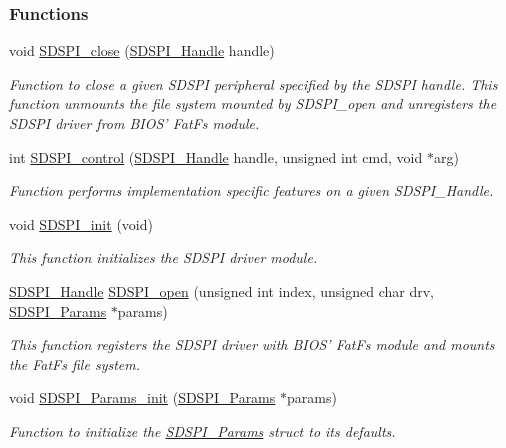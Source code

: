 \subsubsection*{Functions}
\begin{DoxyCompactItemize}
\item 
void \hyperlink{_s_d_s_p_i_8h_a8816c223935b575f10acd5277b9a8ca5}{S\-D\-S\-P\-I\-\_\-close} (\hyperlink{_s_d_s_p_i_8h_abd3d22133d60c2e5afd49722d6bafb7e}{S\-D\-S\-P\-I\-\_\-\-Handle} handle)
\begin{DoxyCompactList}\small\item\em Function to close a given S\-D\-S\-P\-I peripheral specified by the S\-D\-S\-P\-I handle. This function unmounts the file system mounted by S\-D\-S\-P\-I\-\_\-open and unregisters the S\-D\-S\-P\-I driver from B\-I\-O\-S' Fat\-Fs module. \end{DoxyCompactList}\item 
int \hyperlink{_s_d_s_p_i_8h_a541a1db109382fe090ed7a9209a34f61}{S\-D\-S\-P\-I\-\_\-control} (\hyperlink{_s_d_s_p_i_8h_abd3d22133d60c2e5afd49722d6bafb7e}{S\-D\-S\-P\-I\-\_\-\-Handle} handle, unsigned int cmd, void $\ast$arg)
\begin{DoxyCompactList}\small\item\em Function performs implementation specific features on a given S\-D\-S\-P\-I\-\_\-\-Handle. \end{DoxyCompactList}\item 
void \hyperlink{_s_d_s_p_i_8h_a83cfcebe7875d9d8b5e08e57e6785ae6}{S\-D\-S\-P\-I\-\_\-init} (void)
\begin{DoxyCompactList}\small\item\em This function initializes the S\-D\-S\-P\-I driver module. \end{DoxyCompactList}\item 
\hyperlink{_s_d_s_p_i_8h_abd3d22133d60c2e5afd49722d6bafb7e}{S\-D\-S\-P\-I\-\_\-\-Handle} \hyperlink{_s_d_s_p_i_8h_af4a5ca9bb35e8a7df02acf20ceeae66d}{S\-D\-S\-P\-I\-\_\-open} (unsigned int index, unsigned char drv, \hyperlink{struct_s_d_s_p_i___params}{S\-D\-S\-P\-I\-\_\-\-Params} $\ast$params)
\begin{DoxyCompactList}\small\item\em This function registers the S\-D\-S\-P\-I driver with B\-I\-O\-S' Fat\-Fs module and mounts the Fat\-Fs file system. \end{DoxyCompactList}\item 
void \hyperlink{_s_d_s_p_i_8h_a6fe24eaba1cca88242c5df360a074ca8}{S\-D\-S\-P\-I\-\_\-\-Params\-\_\-init} (\hyperlink{struct_s_d_s_p_i___params}{S\-D\-S\-P\-I\-\_\-\-Params} $\ast$params)
\begin{DoxyCompactList}\small\item\em Function to initialize the \hyperlink{struct_s_d_s_p_i___params}{S\-D\-S\-P\-I\-\_\-\-Params} struct to its defaults. \end{DoxyCompactList}\end{DoxyCompactItemize}


